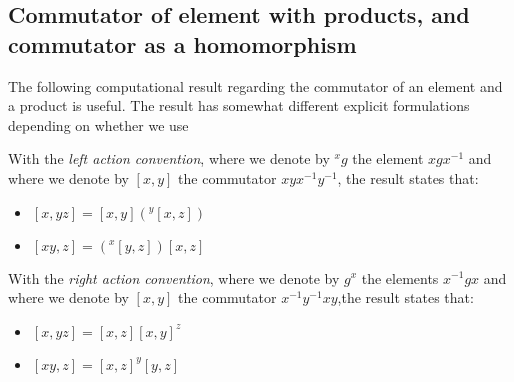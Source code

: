 \subsection{Commutator of element with products, and commutator as a homomorphism}

The following computational result regarding the commutator of an
element and a product is useful. The result has somewhat different explicit formulations depending on whether we use 

With the {\em left action convention}, where we denote by ${}^xg$ the
element $xgx^{-1}$ and where we denote by $[x,y]$ the commutator
$xyx^{-1}y^{-1}$, the result states that:

\begin{itemize}
\item $[x,yz] = [x,y](^y[x,z])$
\item $[xy,z] = ({}^x[y,z])[x,z]$
\end{itemize}

With the {\em right action convention}, where we denote by $g^x$ the
elements $x^{-1}gx$ and where we denote by $[x,y]$ the commutator
$x^{-1}y^{-1}xy$,the result states that:

\begin{itemize}
\item $[x,yz] = [x,z][x,y]^z$
\item $[xy,z] = [x,z]^y[y,z]$
\end{itemize}

